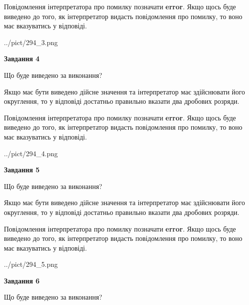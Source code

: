 \documentclass[12pt, ukrainian]{article}
\begin{document}
{\begin {Large}
Повідомлення інтерпретатора про помилку позначати \textbf{error}.
Якщо щось буде виведено до того, як інтерпретатор видасть повідомлення про помилку, 
то воно має вказуватись у відповіді. \par

\begin{center}
	{../pict/294_3.png}
\end{center}
\newpage

{\begin {center}\textbf{Завдання 4}\end {center}}\par
Що буде виведено за виконання? \par

Якщо має бути виведено дійсне значення та інтерпретатор має здійснювати його округлення, 
то у відповіді достатньо правильно вказати два дробових розряди.

Повідомлення інтерпретатора про помилку позначати \textbf{error}.
Якщо щось буде виведено до того, як інтерпретатор видасть повідомлення про помилку, 
то воно має вказуватись у відповіді. \par

\begin{center}
	{../pict/294_4.png}
\end{center}
\newpage

{\begin {center}\textbf{Завдання 5}\end {center}}\par
Що буде виведено за виконання? \par

Якщо має бути виведено дійсне значення та інтерпретатор має здійснювати його округлення, 
то у відповіді достатньо правильно вказати два дробових розряди.

Повідомлення інтерпретатора про помилку позначати \textbf{error}.
Якщо щось буде виведено до того, як інтерпретатор видасть повідомлення про помилку, 
то воно має вказуватись у відповіді. \par

\begin{center}
	{../pict/294_5.png}
\end{center}
\newpage

{\begin {center}\textbf{Завдання 6}\end {center}}\par
Що буде виведено за виконання? \par


\end{Large}}
\end{document}
